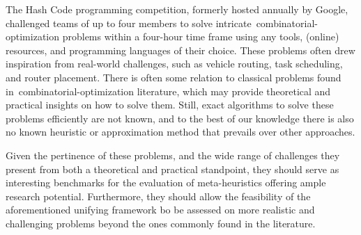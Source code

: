 The Hash Code programming competition, formerly hosted annually by Google,
challenged teams of up to four members to solve
intricate~\acrshort{combinatorial-optimization} problems within a four-hour time
frame using any tools, (online) resources, and programming languages of their
choice. These problems often drew inspiration from real-world challenges, such
as vehicle routing, task scheduling, and router placement. There is often some
relation to classical problems found in~\acrshort{combinatorial-optimization}
literature, which may provide theoretical and practical insights on how to solve
them. Still, exact algorithms to solve these problems efficiently are not known,
and to the best of our knowledge there is also no known heuristic or
approximation method that prevails over other approaches.

Given the pertinence of these problems, and the wide range of challenges they
present from both a theoretical and practical standpoint, they should serve as
interesting benchmarks for the evaluation of meta-heuristics offering ample
research potential. Furthermore, they should allow the feasibility of the
aforementioned unifying framework bo be assessed on more realistic and
challenging problems beyond the ones commonly found in the literature.